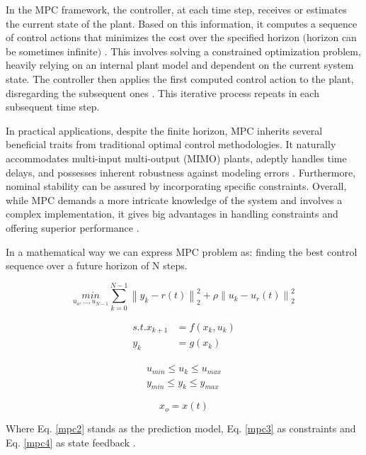 In the MPC framework, the controller, at each time step, receives or estimates the current state of the plant. Based on this information, it computes a sequence of control actions that minimizes the cost over the specified horizon $($horizon can be sometimes infinite$)$ \cite{matlabMPC}\cite{zaklPredRiad}. This involves solving a constrained optimization problem, heavily relying on an internal plant model and dependent on the current system state. The controller then applies the first computed control action to the plant, disregarding the subsequent ones \cite{matlabMPC}. This iterative process repeats in each subsequent time step.

In practical applications, despite the finite horizon, MPC inherits several beneficial traits from traditional optimal control methodologies. It naturally accommodates multi-input multi-output (MIMO) plants, adeptly handles time delays, and possesses inherent robustness against modeling errors \cite{mpcLecture}. Furthermore, nominal stability can be assured by incorporating specific constraints. Overall, while MPC demands a more intricate knowledge of the system and involves a complex implementation, it gives big advantages in handling constraints and offering superior performance \cite{zaklPredRiad}.

In a mathematical way we can express MPC problem as: finding the best control sequence over a future horizon of N steps.

\begin{equation}\label{mpc1}
\underset{u_o,...,u_{N-1}}{min}\sum_{k=0}^{N-1}\left \| y_k-r(t) \right \|_{2}^{2}+\rho \left \| u_k-u_r(t) \right \|_{2}^{2}
\end{equation}

\begin{align}\label{mpc2}
s.t.	x_{k+1}&=f(x_k,u_k)\\ 
	y_k &=g(x_k)
\end{align}

\begin{align}\label{mpc3}
	u_{min}\leq u_k\leq u_{max}\\
	y_{min}\leq y_k\leq y_{max}
\end{align}

\begin{equation}\label{mpc4}
	x_o=x(t)
\end{equation}

Where Eq. \ref{mpc2} stands as the prediction model, Eq. \ref{mpc3} as constraints and Eq. \ref{mpc4} as state feedback \cite{mpcLecture}. 

